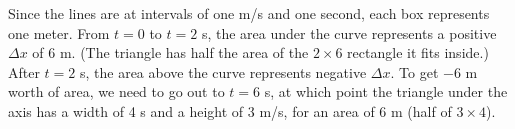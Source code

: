 Since the lines are at intervals of one m/s and one
second, each box represents one meter. From $t=0$ to $t=2$ s,
the area under the curve represents a positive $\Delta x$ of
6 m. (The triangle has half the area of the $2\times6$ rectangle
it fits inside.) After $t=2$ s, the area above the curve
represents negative $\Delta x$. To get $-6$ m worth of area,
we need to go out to $t=6$ s, at which point the triangle
under the axis has a width of 4 s and a height of 3 m/s,
for an area of 6 m (half of $3\times4$).




